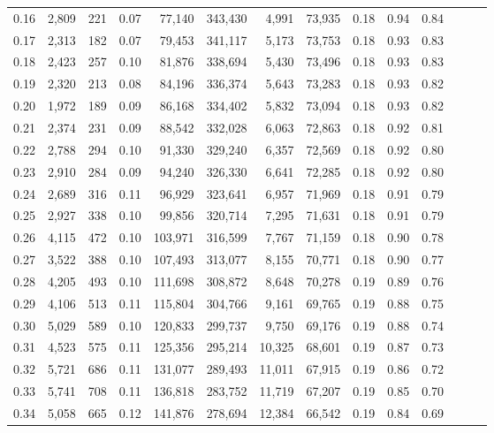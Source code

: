 \begin{tabular}{rrrrrrrrrrrrrr}
0.16 &  2,809 &    221 &  0.07 &   77,140 &  343,430 &   4,991 &  73,935 &  0.18 &  0.94 &      0.84 \\
0.17 &  2,313 &    182 &  0.07 &   79,453 &  341,117 &   5,173 &  73,753 &  0.18 &  0.93 &      0.83 \\
0.18 &  2,423 &    257 &  0.10 &   81,876 &  338,694 &   5,430 &  73,496 &  0.18 &  0.93 &      0.83 \\
0.19 &  2,320 &    213 &  0.08 &   84,196 &  336,374 &   5,643 &  73,283 &  0.18 &  0.93 &      0.82 \\
0.20 &  1,972 &    189 &  0.09 &   86,168 &  334,402 &   5,832 &  73,094 &  0.18 &  0.93 &      0.82 \\
0.21 &  2,374 &    231 &  0.09 &   88,542 &  332,028 &   6,063 &  72,863 &  0.18 &  0.92 &      0.81 \\
0.22 &  2,788 &    294 &  0.10 &   91,330 &  329,240 &   6,357 &  72,569 &  0.18 &  0.92 &      0.80 \\
0.23 &  2,910 &    284 &  0.09 &   94,240 &  326,330 &   6,641 &  72,285 &  0.18 &  0.92 &      0.80 \\
0.24 &  2,689 &    316 &  0.11 &   96,929 &  323,641 &   6,957 &  71,969 &  0.18 &  0.91 &      0.79 \\
0.25 &  2,927 &    338 &  0.10 &   99,856 &  320,714 &   7,295 &  71,631 &  0.18 &  0.91 &      0.79 \\
0.26 &  4,115 &    472 &  0.10 &  103,971 &  316,599 &   7,767 &  71,159 &  0.18 &  0.90 &      0.78 \\
0.27 &  3,522 &    388 &  0.10 &  107,493 &  313,077 &   8,155 &  70,771 &  0.18 &  0.90 &      0.77 \\
0.28 &  4,205 &    493 &  0.10 &  111,698 &  308,872 &   8,648 &  70,278 &  0.19 &  0.89 &      0.76 \\
0.29 &  4,106 &    513 &  0.11 &  115,804 &  304,766 &   9,161 &  69,765 &  0.19 &  0.88 &      0.75 \\
0.30 &  5,029 &    589 &  0.10 &  120,833 &  299,737 &   9,750 &  69,176 &  0.19 &  0.88 &      0.74 \\
0.31 &  4,523 &    575 &  0.11 &  125,356 &  295,214 &  10,325 &  68,601 &  0.19 &  0.87 &      0.73 \\
0.32 &  5,721 &    686 &  0.11 &  131,077 &  289,493 &  11,011 &  67,915 &  0.19 &  0.86 &      0.72 \\
0.33 &  5,741 &    708 &  0.11 &  136,818 &  283,752 &  11,719 &  67,207 &  0.19 &  0.85 &      0.70 \\
0.34 &  5,058 &    665 &  0.12 &  141,876 &  278,694 &  12,384 &  66,542 &  0.19 &  0.84 &      0.69 \\

\end{tabular}
